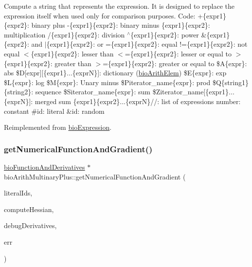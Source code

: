 Compute a string that represents the expression. It is designed to replace the expression itself when used only for comparison purposes. Code\+: +\{expr1\}\{expr2\}\+: binary plus -\/\{expr1\}\{expr2\}\+: binary minus \{expr1\}\{expr2\}\+: multiplication /\{expr1\}\{expr2\}\+: division $^\wedge$\{expr1\}\{expr2\}\+: power \&\{expr1\}\{expr2\}\+: and $\vert$\{expr1\}\{expr2\}\+: or =\{expr1\}\{expr2\}\+: equal !=\{expr1\}\{expr2\}\+: not equal $<$\{expr1\}\{expr2\}\+: lesser than $<$=\{expr1\}\{expr2\}\+: lesser or equal to $>$\{expr1\}\{expr2\}\+: greater than $>$=\{expr1\}\{expr2\}\+: greater or equal to \$A\{expr\}\+: abs \$D\mbox{[}expr\mbox{]}\mbox{[}\{expr1\}...\{exprN\}\mbox{]}\+: dictionary (\hyperlink{classbio_arith_elem}{bio\+Arith\+Elem}) \$E\{expr\}\+: exp \$L\{expr\}\+: log \$M\{expr\}\+: Unary minus \$\+Piterator\+\_\+name\{expr\}\+: prod \$Q\{string1\}\{string2\}\+: sequence \$\+Siterator\+\_\+name\{expr\}\+: sum \$\+Ziterator\+\_\+name\mbox{[}\{expr1\}...\{exprN\}\mbox{]}\+: merged sum \{expr1\}\{expr2\}...\{exprN\}//\+: list of expressions number\+: constant \#id\+: literal \&id\+: random 

Reimplemented from \hyperlink{classbio_expression_a3e4b4dca58dbbc6f0e411b30eb3f60b4}{bio\+Expression}.

\mbox{\label{classbio_arith_multinary_plus_a0ae629f9db89b4697dd2c33719704c31}} 
\subsubsection{\texorpdfstring{get\+Numerical\+Function\+And\+Gradient()}{getNumericalFunctionAndGradient()}}
{\footnotesize\ttfamily \hyperlink{classbio_function_and_derivatives}{bio\+Function\+And\+Derivatives} $\ast$ bio\+Arith\+Multinary\+Plus\+::get\+Numerical\+Function\+And\+Gradient (\begin{DoxyParamCaption}\item[{vector$<$ pat\+U\+Long $>$}]{literal\+Ids,  }\item[{pat\+Boolean}]{compute\+Hessian,  }\item[{pat\+Boolean}]{debug\+Derivatives,  }\item[{pat\+Error $\ast$\&}]{err }\end{DoxyParamCaption})\hspace{0.3cm}{\ttfamily [virtual]}}

